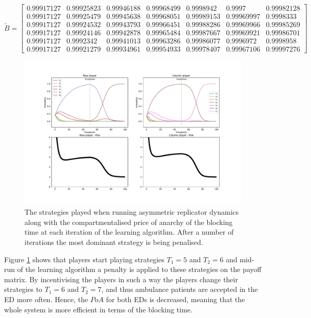 \begin{equation*}
    \tilde{B} = 
    \begin{bmatrix}
        0.99917127 & 0.99925823 & 0.99946188 & 0.99968499 & 0.9998942 &  0.9997 & 0.99982128 \\
        0.99917127 & 0.99925479 & 0.99945638 & 0.99968051 & 0.99989153 & 0.99969997 & 0.9998333 \\
        0.99917127 & 0.99924532 & 0.99943793 & 0.99966451 & 0.99988286 & 0.99969966 & 0.99985269 \\
        0.99917127 & 0.99924146 & 0.99942878 & 0.99965484 & 0.99987667 & 0.99969921 & 0.99986701 \\
        0.99917127 & 0.9992342 &  0.99941013 & 0.99963286 & 0.99986077 & 0.9996972 & 0.9998958 \\
        0.99917127 & 0.99921279 & 0.99934961 & 0.99954933 & 0.99978407 & 0.99967106 & 0.99997276
    \end{bmatrix}
\end{equation*}
\normalsize


\begin{figure}[H]
    \includegraphics[width=\textwidth]{imgs/asymmetric_rd_and_PoA/asymmetric_penalty.pdf}
    \caption{
        The strategies played when running asymmetric replicator dynamics
        along with the compartmentalised price of anarchy of the blocking time 
        at each iteration of the learning algorithm. After a number of 
        iterations the most dominant strategy is being penalised.
    }
    \label{fig:ard_penalty}
\end{figure}

Figure \ref{fig:ard_penalty} shows that players start playing strategies 
\( T_1 = 5\) and \( T_2 = 6 \) and mid-run of the learning algorithm a penalty
is applied to these strategies on the payoff matrix.
By incentivising the players in such a way the players change their strategies 
to \(T_1 = 6\) and \(T_2 = 7\), and thus ambulance patients are accepted in the 
ED more often.
Hence, the \(PoA\) for both EDs is decreased, meaning that the whole system is
more efficient in terms of the blocking time.
